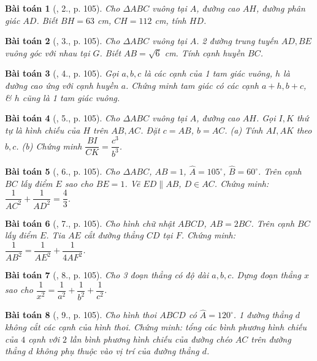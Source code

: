 \documentclass{article}
\newtheorem{baitoan}{Bài toán}
\begin{document}
\begin{baitoan}[\cite{Tuyen_Toan_9}, 2., p. 105]
	Cho $\Delta ABC$ vuông tại $A$, đường cao $AH$, đường phân giác $AD$. Biết $BH = 63$ {\rm cm}, $CH = 112$ {\rm cm}, tính $HD$.
\end{baitoan}

\begin{baitoan}[\cite{Tuyen_Toan_9}, 3., p. 105]
	Cho $\Delta ABC$ vuông tại $A$. 2 đường trung tuyến $AD,BE$ vuông góc với nhau tại $G$. Biết $AB = \sqrt{6}$ {\rm cm}. Tính cạnh huyền $BC$.
\end{baitoan}

\begin{baitoan}[\cite{Tuyen_Toan_9}, 4., p. 105]
	Gọi $a,b,c$ là các cạnh của 1 tam giác vuông, $h$ là đường cao ứng với cạnh huyền $a$. Chứng minh tam giác có các cạnh $a + h,b + c$, \& $h$ cũng là 1 tam giác vuông.
\end{baitoan}

\begin{baitoan}[\cite{Tuyen_Toan_9}, 5., p. 105]
	Cho $\Delta ABC$ vuông tại $A$, đường cao $AH$. Gọi $I,K$ thứ tự là hình chiếu của $H$ trên $AB,AC$. Đặt $c = AB$, $b = AC$. (a) Tính $AI,AK$ theo $b,c$. (b) Chứng minh $\dfrac{BI}{CK} = \dfrac{c^3}{b^3}$.
\end{baitoan}

\begin{baitoan}[\cite{Tuyen_Toan_9}, 6., p. 105]
	Cho $\Delta ABC$, $AB = 1$, $\widehat{A} = 105^\circ$, $\widehat{B} = 60^\circ$. Trên cạnh $BC$ lấy điểm $E$ sao cho $BE = 1$. Vẽ $ED\parallel AB$, $D\in AC$. Chứng minh: $\dfrac{1}{AC^2} + \dfrac{1}{AD^2} = \dfrac{4}{3}$.
\end{baitoan}

\begin{baitoan}[\cite{Tuyen_Toan_9}, 7., p. 105]
	Cho hình chữ nhật $ABCD$, $AB = 2BC$. Trên cạnh $BC$ lấy điểm $E$. Tia $AE$ cắt đường thẳng $CD$ tại $F$. Chứng minh: $\dfrac{1}{AB^2} = \dfrac{1}{AE^2} + \dfrac{1}{4AF^2}$.
\end{baitoan}

\begin{baitoan}[\cite{Tuyen_Toan_9}, 8., p. 105]
	Cho 3 đoạn thẳng có độ dài $a,b,c$. Dựng đoạn thẳng $x$ sao cho $\dfrac{1}{x^2} = \dfrac{1}{a^2} + \dfrac{1}{b^2} + \dfrac{1}{c^2}$.
\end{baitoan}

\begin{baitoan}[\cite{Tuyen_Toan_9}, 9., p. 105]
	Cho hình thoi $ABCD$ có $\widehat{A} = 120^\circ$. 1 đường thẳng $d$ không cắt các cạnh của hình thoi. Chứng minh: tổng các bình phương hình chiếu của $4$ cạnh với $2$ lần bình phương hình chiếu của đường chéo $AC$ trên đường thẳng $d$ không phụ thuộc vào vị trí của đường thẳng $d$.
\end{baitoan}
\end{document}
